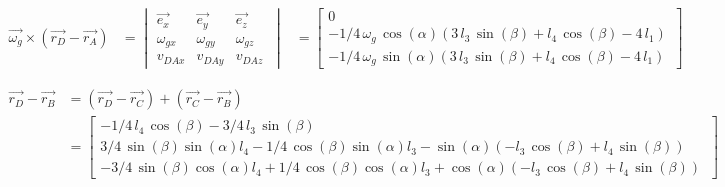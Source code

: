 \begin{equation*}
\begin{split}
\overrightarrow{\omega_{g}}\times(\overrightarrow{r_{D}}-\overrightarrow{r_{A}})
&=	\begin{vmatrix}
	\overrightarrow{e_{x}} & \overrightarrow{e_{y}} & \overrightarrow{e_{z}}\\
	\omega_{gx} & \omega_{gy} & \omega_{gz}\\
	v_{DAx} & v_{DAy} & v_{DAz}\
	\end{vmatrix}
&=	\begin{bmatrix}
	0\\
	-1/4\,\omega_{g}\,\cos\left( \alpha \right)  \left( 3\,l_{3}\,\sin \left( \beta \right) +l_{4}\,\cos \left( \beta \right) -4\,l_{1} \right) \\
	-1/4\,\omega_{g}\,\sin \left( \alpha \right)  \left( 3\,l_{3}\,\sin\left( \beta \right) +l_{4}\,\cos \left( \beta \right) -4\,l_{1}\right) \
	\end{bmatrix}
\end{split}
\end{equation*}

\begin{equation*}
\begin{split}
\overrightarrow{r_{D}}-\overrightarrow{r_{B}}
&=	(\overrightarrow{r_{D}}-\overrightarrow{r_{C}}) + 		(\overrightarrow{r_{C}}-\overrightarrow{r_{B}})\\
&=	\begin{bmatrix}
	-1/4\,l_{4}\,\cos \left( \beta \right) -3/4\,l_{3}\,\sin \left( \beta \right) \\
	3/4\,\sin\left( \beta \right) \sin \left( \alpha \right) l_{4}-1/4\,\cos\left( \beta \right) \sin \left( \alpha \right) l_{3}-\sin \left( \alpha \right)  \left( -l_{3}\,\cos \left( \beta \right) +l_{4}\,\sin\left( \beta \right)  \right) \\
	-3/4\,\sin \left( \beta \right) \cos \left( \alpha \right) l_{4}+1/4\,\cos \left( \beta\right) \cos \left( \alpha \right) l_{3}+\cos \left( \alpha \right) \left( -l_{3}\,\cos \left( \beta \right) +l_{4}\,\sin \left( \beta\right)  \right) \	
	\end{bmatrix}
\end{split}
\end{equation*}

